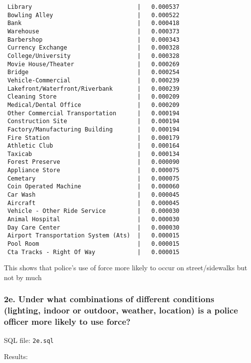 \documentclass[10pt]{article}
\begin{document}
\begin{verbatim}
 Library                              |   0.000537
 Bowling Alley                        |   0.000522
 Bank                                 |   0.000418
 Warehouse                            |   0.000373
 Barbershop                           |   0.000343
 Currency Exchange                    |   0.000328
 College/University                   |   0.000328
 Movie House/Theater                  |   0.000269
 Bridge                               |   0.000254
 Vehicle-Commercial                   |   0.000239
 Lakefront/Waterfront/Riverbank       |   0.000239
 Cleaning Store                       |   0.000209
 Medical/Dental Office                |   0.000209
 Other Commercial Transportation      |   0.000194
 Construction Site                    |   0.000194
 Factory/Manufacturing Building       |   0.000194
 Fire Station                         |   0.000179
 Athletic Club                        |   0.000164
 Taxicab                              |   0.000134
 Forest Preserve                      |   0.000090
 Appliance Store                      |   0.000075
 Cemetary                             |   0.000075
 Coin Operated Machine                |   0.000060
 Car Wash                             |   0.000045
 Aircraft                             |   0.000045
 Vehicle - Other Ride Service         |   0.000030
 Animal Hospital                      |   0.000030
 Day Care Center                      |   0.000030
 Airport Transportation System (Ats)  |   0.000015
 Pool Room                            |   0.000015
 Cta Tracks - Right Of Way            |   0.000015
\end{verbatim}

This shows that police's use of force more likely to occur on street/sidewalks but not by much

\subsubsection*{2e. Under what combinations of different conditions (lighting, indoor or outdoor, weather, location) is a police officer more likely to use force?}

SQL file: \texttt{2e.sql}

Results:
\end{document}
